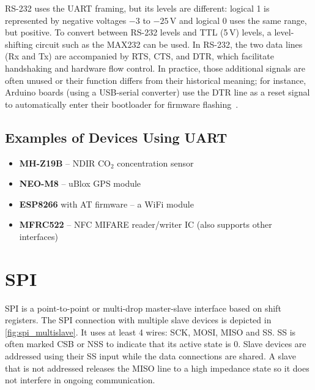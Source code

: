 RS-232 uses the \gls{UART} framing, but its levels are different: logical 1 is represented by negative voltages $-3$ to $-25$\,V and logical 0 uses the same range, but positive. To convert between RS-232 levels and \gls{TTL} (5\,V) levels, a level-shifting circuit such as the MAX232 can be used. In RS-232, the two data lines (Rx and Tx) are accompanied by \gls{RTS}, \gls{CTS}, and \gls{DTR}, which facilitate handshaking and hardware flow control. In practice, those additional signals are often unused or their function differs from their historical meaning; for instance, Arduino boards (using a USB-serial converter) use the \gls{DTR} line as a reset signal to automatically enter their bootloader for firmware flashing~\cite{arduinodtr}.

\subsection{Examples of Devices Using UART}

\begin{itemize}
	\item \textbf{MH-Z19B} -- \gls{NDIR} CO$_2$ concentration sensor
	\item \textbf{NEO-M8} -- uBlox \gls{GPS} module
	\item \textbf{ESP8266} with AT firmware -- a WiFi module
	\item \textbf{MFRC522} -- \gls{NFC} MIFARE reader/writer \gls{IC} (also supports other interfaces)
\end{itemize}

\section{SPI} \label{sec:theory_spi}

\acrfull{SPI} is a point-to-point or multi-drop master-slave interface based on shift registers. The \gls{SPI} connection with multiple slave devices is depicted in \cref{fig:spi_multislave}. It uses at least 4 wires: \gls{SCK}, \gls{MOSI}, \gls{MISO} and \gls{SS}. \gls{SS} is often marked \gls{CSB} or \gls{NSS} to indicate that its active state is 0. Slave devices are addressed using their \gls{SS} input while the data connections are shared. A slave that is not addressed releases the \gls{MISO} line to a high impedance state so it does not interfere in ongoing communication.

